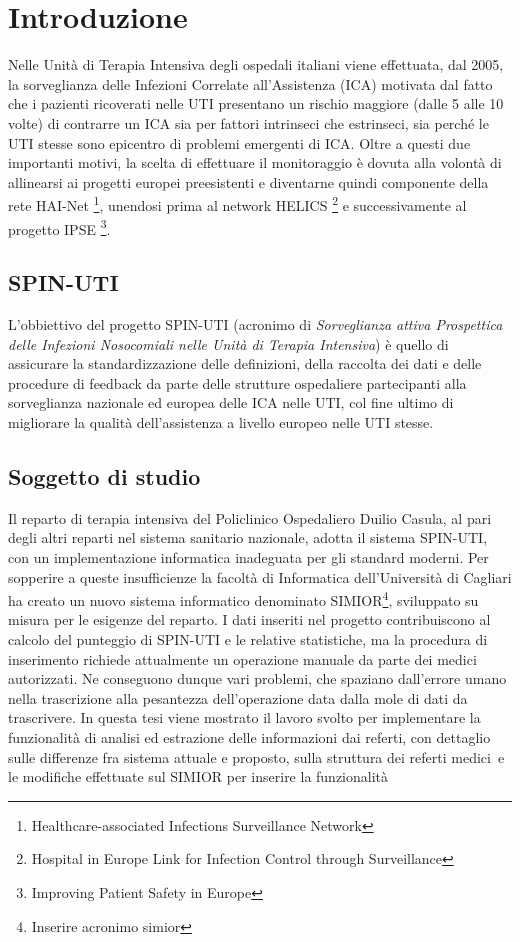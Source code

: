 \chapter{Introduzione}
Nelle Unità di Terapia Intensiva degli ospedali italiani viene effettuata, dal 2005, la sorveglianza delle Infezioni Correlate all'Assistenza (ICA) motivata dal fatto che i pazienti ricoverati nelle UTI presentano un rischio maggiore (dalle 5 alle 10 volte) di contrarre un ICA sia per fattori intrinseci che estrinseci, sia perché le UTI stesse sono epicentro di problemi emergenti di ICA. Oltre a questi due importanti motivi, la scelta di effettuare il monitoraggio è dovuta alla volontà di allinearsi ai progetti europei preesistenti e diventarne quindi componente della rete HAI-Net \footnote{Healthcare-associated Infections Surveillance Network},  
unendosi prima al network HELICS \footnote{Hospital in Europe Link for Infection Control through Surveillance} e successivamente al progetto IPSE \footnote{Improving Patient Safety in Europe}.
\section{SPIN-UTI}
L'obbiettivo del progetto SPIN-UTI (acronimo di \textit{Sorveglianza attiva Prospettica delle Infezioni Nosocomiali nelle Unità di Terapia Intensiva}) è quello di assicurare la standardizzazione delle definizioni, della raccolta dei dati e delle procedure di feedback da parte delle strutture ospedaliere partecipanti alla sorveglianza nazionale ed europea delle ICA nelle UTI, col fine ultimo di migliorare la qualità dell'assistenza a livello europeo nelle UTI stesse.
\newpage
\section{Soggetto di studio}
Il reparto di terapia intensiva del Policlinico Ospedaliero Duilio Casula, al pari degli altri reparti nel sistema sanitario nazionale, adotta il sistema SPIN-UTI, con un 
implementazione informatica inadeguata per gli standard moderni. Per sopperire a queste insufficienze la facoltà di Informatica dell'Università di Cagliari ha creato un nuovo sistema informatico denominato SIMIOR\footnote{Inserire acronimo simior}, sviluppato su misura per le esigenze del reparto. I dati inseriti nel progetto contribuiscono al calcolo del punteggio di SPIN-UTI e le relative statistiche, ma la procedura di inserimento richiede attualmente un operazione manuale da parte dei medici autorizzati. Ne conseguono dunque vari problemi, che spaziano dall'errore umano nella trascrizione alla pesantezza dell'operazione data dalla mole di dati da trascrivere.
In questa tesi viene mostrato il lavoro svolto per implementare la funzionalità di analisi ed estrazione delle informazioni dai referti, con dettaglio sulle differenze fra sistema attuale e proposto, sulla struttura dei referti medici\ e le modifiche effettuate sul SIMIOR per inserire la funzionalità